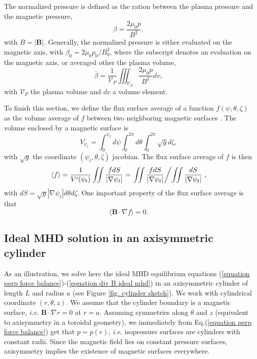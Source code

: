 \documentclass[my_thesis.tex]{subfiles}
\begin{document}
The normalized pressure is defined as the ration between the plasma pressure and the magnetic pressure,
\begin{equation}
	\beta = \frac{2\mu_0 p}{B^2},
\end{equation}
with $B=|\mathbf{B}|$. Generally, the normalized pressure is either evaluated on the magnetic axis, with $\beta_0=2\mu_0 p_0/B_0^2$, where the subscript denotes an evaluation on the magnetic axis, or averaged other the plasma volume,
\begin{equation}
	\bar\beta = \frac{1}{\mathcal{V}_P} \iiint_{\mathcal{V}_P} \frac{2\mu_0 p}{B^2} dv,
\end{equation}
with $\mathcal{V}_P$ the plasma volume and $dv$ a volume element.

To finish this section, we define the flux surface average of a function $f(\psi,\theta,\zeta)$ as the volume average of $f$ between two neighboring magnetic surfaces \citep{helanderTheoryPlasmaConfinement2014}. The volume enclosed by a magnetic surface is
\begin{equation}
	V_{\psi_t} = \int_0^{\psi_t} d\psi \int_0^{2\pi} d\theta \int_0^{2\pi} \sqrt{g}d\zeta,
\end{equation}
with $\sqrt{g}$ the coordinate $(\psi_t, \theta, \zeta)$ jacobian. The flux surface average of $f$ is then
\begin{equation}
	\langle f \rangle = \frac{1}{V'(\psi_t)}\iint \frac{f dS}{|\nabla \psi_t|} = \left.\iint \frac{f dS}{|\nabla \psi_t|} \middle/ \iint\frac{dS}{|\nabla \psi_t|} \right.,
\end{equation}
with $dS=\sqrt{g}|\nabla\psi_t|d\theta d\zeta$. One important property of the flux surface average is that
\begin{equation}
	\langle \mathbf{B}\cdot\nabla f\rangle = 0. \label{eq.property_flux_average}
\end{equation}



\subsection{Ideal MHD solution in an axisymmetric cylinder}\label{appendix jxb=grad p solution}
As an illustration, we solve here the ideal MHD equilibrium equations (\ref{equation perp force balance})-(\ref{equation div B ideal mhd}) in an axisymmetric cylinder of length $L$ and radius $a$ (see Figure \ref{fig. cylinder sketch}). We work with cylindrical coordinate $(r,\theta,z)$. We assume that the cylinder boundary is a magnetic surface, \textit{i.e.} $\mathbf{B}\cdot\nabla r=0$ at $r=a$. Assuming symmetries along $\theta$ and $z$ (equivalent to axisymmetry in a toroidal geometry), we immediately from Eq.(\ref{equation perp force balance}) get that $p=p(r)$, \textit{i.e.} isopressure surfaces are cylinders with constant radii. Since the magnetic field lies on constant pressure surfaces, axisymmetry implies the existence of magnetic surfaces everywhere.
\end{document}
